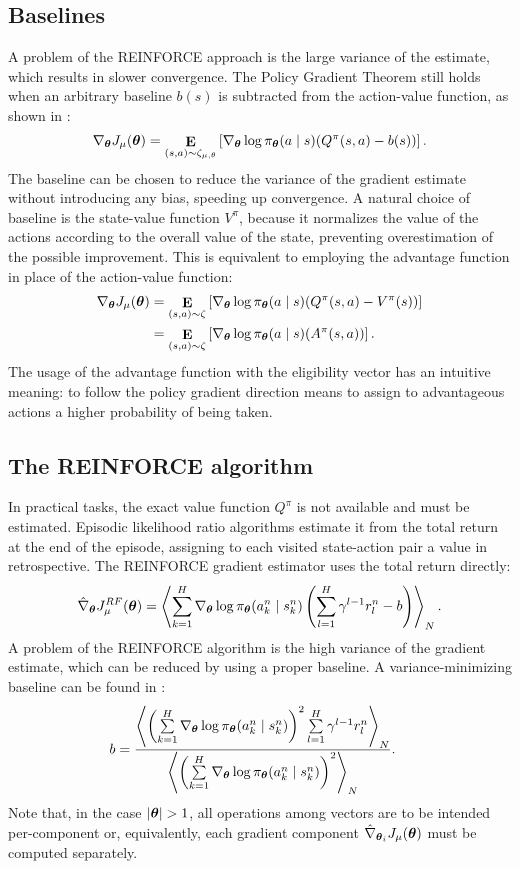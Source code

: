 \subsection{Baselines}
A problem of the REINFORCE approach is the large variance of the estimate, which results in slower convergence.
The Policy Gradient Theorem still holds when an arbitrary baseline $b(s)$ is subtracted from the action-value function, as shown in \cite{Williams1992}:
\[
	\nabla_{\boldsymbol{\theta}}J_\mu(\boldsymbol{\theta}) = \mathop{\mathbf{E}}_{(s,a)\sim\zeta_{\mu,\theta}}
		\left[\nabla_{\boldsymbol{\theta}}\log\pi_{\boldsymbol{\theta}}(a \mid s) (Q^{\pi}(s,a) - b(s))\right].
\]
The baseline can be chosen to reduce the variance of the gradient estimate without introducing any bias, speeding up convergence. A natural choice of baseline is the state-value function $V^{\pi}$, because it normalizes the value of the actions according to the overall value of the state, preventing overestimation of the possible improvement. This is equivalent to employing the advantage function in place of the action-value function:
\begin{align*}
	\nabla_{\boldsymbol{\theta}}J_\mu(\boldsymbol{\theta}) &= \mathop{\mathbf{E}}_{(s,a)\sim\zeta}
		\left[\nabla_{\boldsymbol{\theta}}\log\pi_{\boldsymbol{\theta}}(a \mid s) (Q^{\pi}(s,a) - V^{\pi}(s))\right] \\
		&= \mathop{\mathbf{E}}_{(s,a)\sim\zeta}
				\left[\nabla_{\boldsymbol{\theta}}\log\pi_{\boldsymbol{\theta}}(a \mid s) (A^{\pi}(s,a))\right].
\end{align*}
The usage of the advantage function with the eligibility vector has an intuitive meaning: to follow the policy gradient direction means to assign to advantageous actions a higher probability of being taken. 

\subsection{The REINFORCE algorithm}
In practical tasks, the exact value function $Q^{\pi}$ is not available and must be estimated. Episodic likelihood ratio algorithms estimate it from the total return at the end of the episode, assigning to each visited state-action pair a value in retrospective. The REINFORCE gradient estimator \cite{Williams1992} uses the total return directly:
\[
	\hat{\nabla}_{\boldsymbol{\theta}}J_{\mu}^{RF}(\boldsymbol{\theta}) = 
		\left\langle
		\sum\limits_{k=1}^H\nabla_{\boldsymbol{\theta}}\log\pi_{\boldsymbol{\theta}}(a_k^n \mid s_k^n)
		\left(\sum\limits_{l=1}^H\gamma^{l-1}r_l^n-b\right)\right\rangle_N.
\]
A problem of the REINFORCE algorithm is the high variance of the gradient estimate, which can be reduced by using a proper baseline. A variance-minimizing baseline can be found in \cite{Peters2008reinf}:
\begin{align*}
	b &= \frac{\left\langle\left(\sum\limits_{k=1}^H\nabla_{\boldsymbol{\theta}}\log\pi_{\boldsymbol{\theta}}(a_k^n \mid s_k^n)\right)^2
		\sum\limits_{l=1}^H\gamma^{l-1}r_l^n\right\rangle_N}
		{\left\langle\left(\sum\limits_{k=1}^H\nabla_{\boldsymbol{\theta}}\log\pi_{\boldsymbol{\theta}}(a_k^n \mid s_k^n)\right)^2
		\right\rangle_N}.
\end{align*}
Note that, in the case $|\vtheta|>1$, all operations among vectors are to be intended per-component or, equivalently, each gradient component $\hat{\nabla}_{\boldsymbol{\theta}_i}J_{\mu}(\boldsymbol{\theta})$ must be computed separately.

